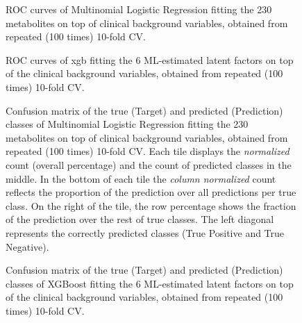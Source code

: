 \documentclass{amsart}
\begin{document}
\begin{figure}[h]
  
  \caption{\label{roc:full}ROC curves of Multinomial Logistic Regression fitting the 230 metabolites on top of clinical background variables, obtained from repeated (100 times) 10-fold CV. }
\end{figure} \clearpage
\begin{figure}[h]
  
  \caption{\label{roc:xgb} ROC curves of \acrlong{xgb} fitting the 6 ML-estimated latent factors on top of the clinical background variables, obtained from repeated (100 times) 10-fold CV. }
  \end{figure} 
\begin{figure}[h]
  
  \caption{Confusion matrix of the true (Target) and predicted (Prediction) classes of Multinomial Logistic Regression fitting the 230 metabolites on top of clinical background variables, obtained from repeated (100 times) 10-fold CV. Each tile displays the \textit{normalized} count (overall percentage) and the count of predicted classes in the middle. In the bottom of each tile the \textit{column normalized} count reflects the proportion of the prediction over all predictions per true class. On the right of the tile, the row percentage shows the fraction of the prediction over the rest of true classes. The left diagonal represents the correctly predicted classes (True Positive and True Negative).}
  \label{cm:full}
\end{figure} \clearpage
\begin{figure}[ht]
    
    \caption{Confusion matrix of the true (Target) and predicted (Prediction) classes of XGBoost fitting the 6 ML-estimated latent factors on top of the clinical background variables, obtained from repeated (100 times) 10-fold CV.}
  \label{cm:xgboost}
\end{figure}
\end{document}

